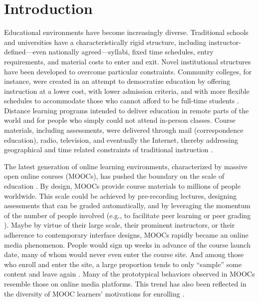 \documentclass{sigchi}\usepackage[]{graphicx}\usepackage[]{color}
\begin{document}


\section{Introduction}

Educational environments have become increasingly diverse. Traditional schools and universities have a characteristically rigid structure, including instructor-defined---even nationally agreed---syllabi, fixed time schedules, entry requirements, and material costs to enter and exit. Novel institutional structures have been developed to overcome particular constraints. Community colleges, for instance, were created in an attempt to democratize education by offering instruction at a lower cost, with lower admission criteria, and with more flexible schedules to accommodate those who cannot afford to be full-time students \cite{goldrick2010challenges}. Distance learning programs intended to deliver education in remote parts of the world and for people who simply could not attend in-person classes. Course materials, including assessments, were delivered through mail (correspondence education), radio, television, and eventually the Internet, thereby addressing geographical and time related constraints of traditional instruction \cite{moore1996distance}.

The latest generation of online learning environments, characterized by massive open online courses (MOOCs), has pushed the boundary on the scale of education \cite{waldrop2013campus}. By design, MOOCs provide course materials to millions of people worldwide. This scale could be achieved by pre-recording lectures, designing assessments that can be graded automatically, and by leveraging the momentum of the number of people involved (e.g., to facilitate peer learning or peer grading \cite{kulkarni2013peer,cambre2014talkabout}). Maybe by virtue of their large scale, their prominent instructors, or their adherence to contemporary interface designs, MOOCs rapidly became an online media phenomenon. People would sign up weeks in advance of the course launch date, many of whom would never even enter the course site. And among those who enroll and enter the site, a large proportion tends to only ``sample'' some content and leave again \cite{kizilcec2013deconstructing}. Many of the prototypical behaviors observed in MOOCs \cite{kizilcec2013deconstructing,breslow2013studying} resemble those on online media platforms. This trend has also been reflected in the diversity of MOOC learners' motivations for enrolling \cite{kizilcec2015motivation}.
\end{document}
